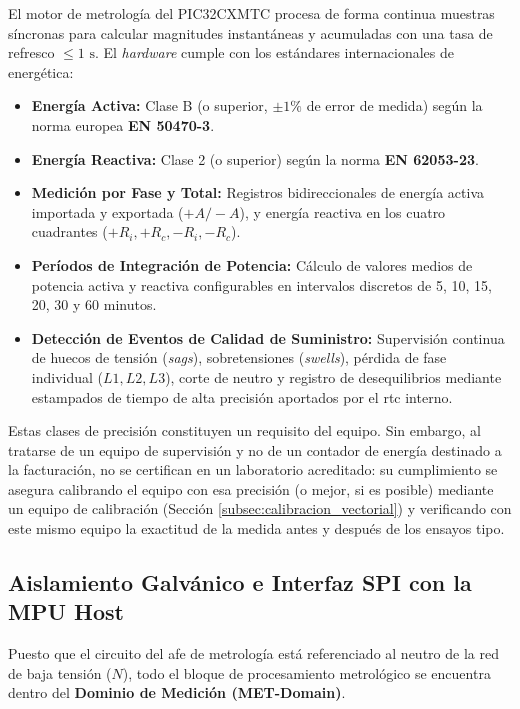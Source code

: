 El motor de metrología del PIC32CXMTC procesa de forma continua muestras síncronas para calcular magnitudes instantáneas y acumuladas con una tasa de refresco $\le 1\text{ s}$. El \textit{hardware} cumple con los estándares internacionales de  energética:
\begin{itemize}
    \item \textbf{Energía Activa:} Clase B (o superior, $\pm 1\%$ de error de medida) según la norma europea \textbf{EN 50470-3}.
    \item \textbf{Energía Reactiva:} Clase 2 (o superior) según la norma \textbf{EN 62053-23}.
    \item \textbf{Medición por Fase y Total:} Registros bidireccionales de energía activa importada y exportada ($+A / -A$), y energía reactiva en los cuatro cuadrantes ($+R_i, +R_c, -R_i, -R_c$).
    \item \textbf{Períodos de Integración de Potencia:} Cálculo de valores medios de potencia activa y reactiva configurables en intervalos discretos de 5, 10, 15, 20, 30 y 60 minutos.
    \item \textbf{Detección de Eventos de Calidad de Suministro:} Supervisión continua de huecos de tensión (\textit{sags}), sobretensiones (\textit{swells}), pérdida de fase individual ($L1, L2, L3$), corte de neutro y registro de desequilibrios mediante estampados de tiempo de alta precisión aportados por el \gls{rtc} interno.
\end{itemize}

Estas clases de precisión constituyen un requisito del equipo. Sin embargo, al tratarse de un equipo de supervisión y no de un contador de energía destinado a la facturación, no se certifican en un laboratorio acreditado: su cumplimiento se asegura calibrando el equipo con esa precisión (o mejor, si es posible) mediante un equipo de calibración (Sección \ref{subsec:calibracion_vectorial}) y verificando con este mismo equipo la exactitud de la medida antes y después de los ensayos tipo.

\subsection{Aislamiento Galvánico e Interfaz SPI con la MPU Host}
\label{subsec:aislamiento_metrologia_cpu}

Puesto que el circuito del \gls{afe} de metrología está referenciado al neutro de la red de baja tensión ($N$), todo el bloque de procesamiento metrológico se encuentra dentro del \textbf{Dominio de Medición (MET-Domain)}. 

